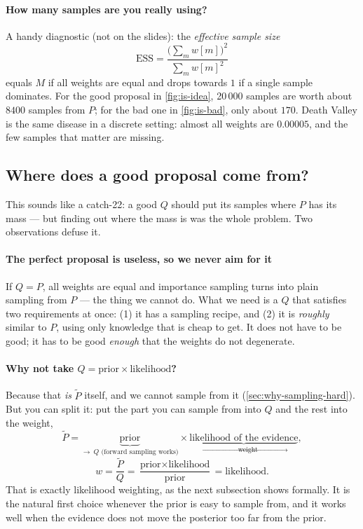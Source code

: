 \documentclass[11pt, oneside]{book}
\let\originalsubsection\subsection
\renewcommand{\subsection}{\Needspace{6\baselineskip}\originalsubsection}
\begin{document}
\paragraph{How many samples are you really using?} A handy diagnostic (not on the slides): the \emph{effective sample size}
\[
\mathrm{ESS} = \frac{\big(\sum_m w[m]\big)^2}{\sum_m w[m]^2}
\]
equals $M$ if all weights are equal and drops towards $1$ if a single sample
dominates. For the good proposal in \cref{fig:is-idea}, 20\,000 samples are
worth about $8400$ samples from $P$; for the bad one in \cref{fig:is-bad},
only about $170$. Death Valley is the same disease in a discrete setting:
almost all weights are $0.00005$, and the few samples that matter are
missing.

\subsection{Where does a good proposal come from?}
\label{sec:where-q}

This sounds like a catch-22: a good $Q$ should put its samples where $P$ has
its mass --- but finding out where the mass is was the whole problem. Two
observations defuse it.

\paragraph{The perfect proposal is useless, so we never aim for it} If $Q = P$,
all weights are equal and importance sampling turns into plain sampling from
$P$ --- the thing we cannot do. What we need is a $Q$ that satisfies two
requirements at once: (1) it has a sampling recipe, and (2) it is
\emph{roughly} similar to $P$, using only knowledge that is cheap to get. It
does not have to be good; it has to be good \emph{enough} that the weights do
not degenerate.

\paragraph{Why not take $Q = \text{prior} \times \text{likelihood}$?} Because
that \emph{is} $\tilde P$ itself, and we cannot sample from it
(\cref{sec:why-sampling-hard}). But you can split it: put the part you can
sample from into $Q$ and the rest into the weight,
\[
\tilde P = \underbrace{\text{prior}}_{\to\ Q \text{ (forward sampling works)}}
\times \underbrace{\text{likelihood of the evidence}}_{\to\ \text{weight}},
\]
\[
w = \frac{\tilde P}{Q} = \frac{\text{prior} \times \text{likelihood}}{\text{prior}} = \text{likelihood}.
\]
That is exactly likelihood weighting, as the next subsection shows formally.
It is the natural first choice whenever the prior is easy to sample from,
and it works well when the evidence does not move the posterior too far from
the prior.
\end{document}
